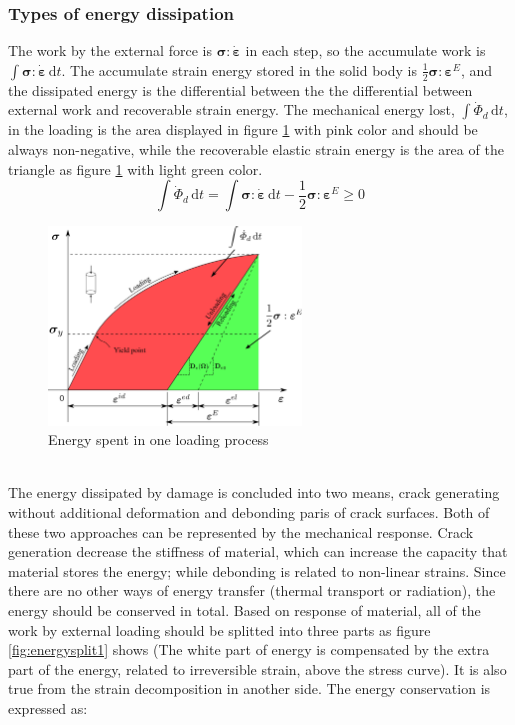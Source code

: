 \documentclass[preprint,review,12pt]{elsarticle}
\newcommand{\ud}{\textrm{d}}
\begin{document}
\subsubsection{Types of energy dissipation}
The work by the external force is $\bm\sigma:\dot{\bm\varepsilon}$ in each step, so the accumulate work is $\int \bm\sigma:\dot{\bm\varepsilon} \,\ud t$. The accumulate strain energy stored in the solid body is $\frac{1}{2}\bm\sigma:\bm\varepsilon^E$, and the dissipated energy is the differential between the the differential between external work and recoverable strain energy. The mechanical energy lost, $\int \dot\varPhi_d \, \ud t$, in the loading is the area displayed in figure \ref{fig:energylost} with pink color and should be always non-negative, while the recoverable elastic strain energy is the area of the triangle as figure \ref{fig:energylost} with light green color.
%
\begin{equation}
   \label{eq:elost}
   \int \dot\varPhi_{d} \, \ud t = \int\bm\sigma:\dot{\bm\varepsilon}\,\ud t -\frac{1}{2}\bm\sigma:\bm\varepsilon^E\ge 0
\end{equation}
%
\begin{figure}[htbp]
   \centering
  \includegraphics[width=0.6\textwidth]{inkscape/energy_lost/energy_lost2.eps}
   \caption{Energy spent in one loading process}
   \label{fig:energylost}
\end{figure}
\
\\
The energy dissipated by damage is concluded into two means, crack generating without additional deformation and debonding paris of crack surfaces. Both of these two approaches can be represented by the mechanical response. Crack generation decrease the stiffness of material, which can increase the capacity that material stores the energy; while debonding is related to non-linear strains. Since there are no other ways of energy transfer (thermal transport or radiation), the energy should be conserved in total. Based on response of material, all of the work by external loading should be splitted into three parts as figure \ref{fig:energysplit1} shows (The white part of energy is compensated by the extra part of the energy, related to irreversible strain, above the stress curve). It is also true from the strain decomposition in another side. The energy conservation is expressed as:
\end{document}
